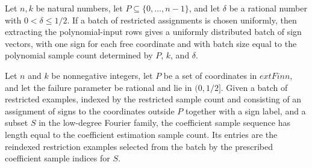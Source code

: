 \begin{theorem}
\label{FABL.map_uniformPMF_lowDegreeJuntaPolynomialInputRow}
\leanok
{}
Let $n,k$ be natural numbers, let $P\subseteq\{0,\ldots,n-1\}$, and let $\delta$ be a
rational number with $0<\delta\leq 1/2$. If a batch of restricted assignments is chosen
uniformly, then extracting the polynomial-input rows gives a uniformly distributed batch
of sign vectors, with one sign for each free coordinate and with batch size equal to the
polynomial sample count determined by $P$, $k$, and $\delta$.
\end{theorem}

\begin{definition}
\label{FABL.lowDegreeJuntaCoefficientSamples}
\leanok
{}
Let $n$ and $k$ be nonnegative integers, let $P$ be a set of coordinates in $	ext{Fin
}n$, and let the failure parameter be rational and lie in $(0,1/2]$. Given a batch of
restricted examples, indexed by the restricted sample count and consisting of an
assignment of signs to the coordinates outside $P$ together with a sign label, and a
subset $S$ in the low-degree Fourier family, the coefficient sample sequence has length
equal to the coefficient estimation sample count. Its entries are the reindexed
restriction examples selected from the batch by the prescribed coefficient sample
indices for $S$.
\end{definition}

